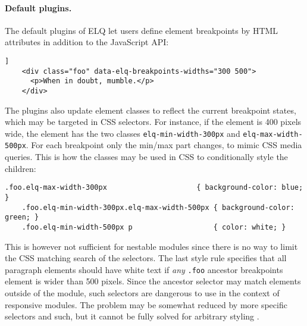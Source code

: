 \documentclass[sigconf,9pt]{acmart}
\newcommand{\elq}{ELQ}
\newcommand{\code}[1]{\texttt{#1}}
\begin{document}
  \paragraph{Default plugins.}
  The default plugins of \elq{} let users define element breakpoints by HTML attributes in addition to the JavaScript API:
  \begin{lstlisting}[gobble=4,caption={},captionpos=b,label={}]]
    <div class="foo" data-elq-breakpoints-widths="300 500">
      <p>When in doubt, mumble.</p>
    </div>
  \end{lstlisting}
  The plugins also update element classes to reflect the current breakpoint states, which may be targeted in CSS selectors.
  For instance, if the element is 400 pixels wide, the element has the two classes \code{elq-min-width-300px} and \code{elq-max-width-500px}.
  For each breakpoint only the min/max part changes, to mimic CSS media queries.
  This is how the classes may be used in CSS to conditionally style the children:
  \begin{lstlisting}[gobble=4]
    .foo.elq-max-width-300px                     { background-color: blue; }
    .foo.elq-min-width-300px.elq-max-width-500px { background-color: green; }
    .foo.elq-min-width-500px p                   { color: white; }
  \end{lstlisting}
  This is however not sufficient for nestable modules since there is no way to limit the CSS matching search of the selectors.
  The last style rule specifies that all paragraph elements should have white text if \emph{any} \code{.foo} ancestor breakpoints element is wider than 500 pixels.
  Since the ancestor selector may match elements outside of the module, such selectors are dangerous to use in the context of responsive modules.
  The problem may be somewhat reduced by more specific selectors and such, but it cannot be fully solved for arbitrary styling \cite{elq-thesis}.
\end{document}
